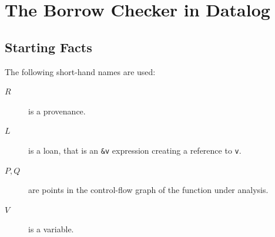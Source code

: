 \documentclass[11pt,a4paper,twoside,openany]{report}
\newcommand{\InRust}[1]{\texttt{#1}}
\begin{document}
\section{The Borrow Checker in Datalog}

\subsection{Starting Facts}
\label{sec:input-facts}

The following short-hand names are used:
\begin{description}
\item[$R$] is a provenance.
\item[$L$] is a loan, that is an \InRust{&v} expression creating a reference
  to \InRust{v}.
\item[$P, Q$] are points in the control-flow graph of the function under analysis.
\item[$V$] is a variable.
\end{description}
\end{document}
